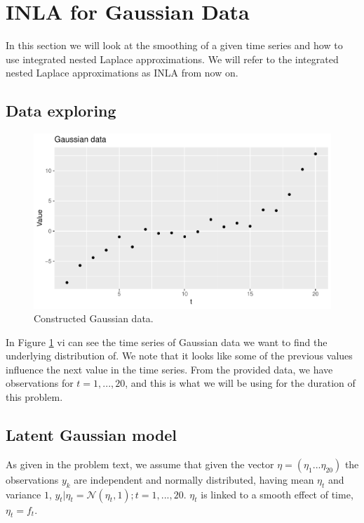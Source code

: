 \section{INLA for Gaussian Data}
In this section we will look at the smoothing of a given time series and how to use integrated nested Laplace approximations. We will refer to the integrated nested Laplace approximations as INLA from now on.

\subsection{Data exploring}
 
\begin{figure}[h]
    \centering
    \includegraphics[width=\textwidth]{Images/gaussian_data.pdf}
    \caption{Constructed Gaussian data.}
    \label{fig:gaussian_data}
\end{figure}

In Figure \ref{fig:gaussian_data} vi can see the time series of Gaussian data we want to find the underlying distribution of. We note that it looks like some of the previous values influence the next value in the time series. From the provided data, we have observations for $t = 1,...,20$, and this is what we will be using for the duration of this problem. 


\subsection{Latent Gaussian model}

As given in the problem text, we assume that given the vector $\eta = (\eta_1...\eta_{20})$ the observations $y_k$ are independent and normally distributed, having mean $\eta_t$ and variance $1$,  $y_t|\eta_t = \mathcal{N}(\eta_t, 1); t = 1,...,20$. $\eta_t$ is linked to a smooth effect of time, $\eta_t = f_t$. 

